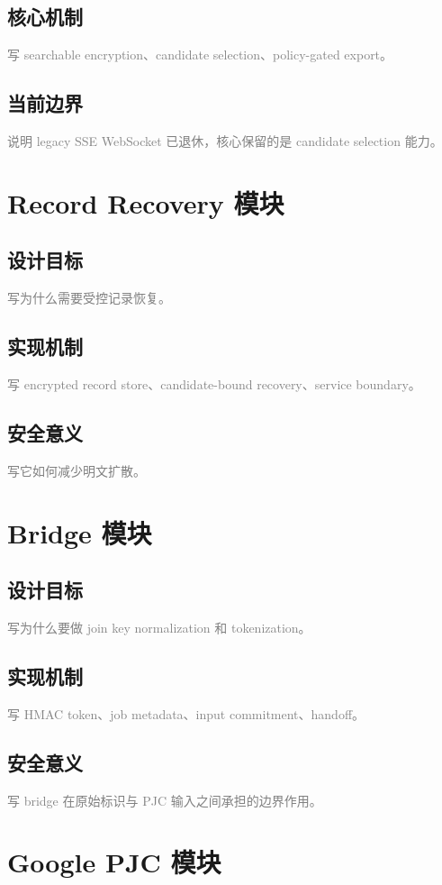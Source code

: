 \documentclass[UTF8,a4paper,12pt,oneside]{ctexrep}
\newcommand{\placeholder}[1]{\textcolor{gray}{#1}}
\begin{document}
\subsection{核心机制}
\placeholder{写 searchable encryption、candidate selection、policy-gated export。}
\subsection{当前边界}
\placeholder{说明 legacy SSE WebSocket 已退休，核心保留的是 candidate selection 能力。}

\section{Record Recovery 模块}
\subsection{设计目标}
\placeholder{写为什么需要受控记录恢复。}
\subsection{实现机制}
\placeholder{写 encrypted record store、candidate-bound recovery、service boundary。}
\subsection{安全意义}
\placeholder{写它如何减少明文扩散。}

\section{Bridge 模块}
\subsection{设计目标}
\placeholder{写为什么要做 join key normalization 和 tokenization。}
\subsection{实现机制}
\placeholder{写 HMAC token、job metadata、input commitment、handoff。}
\subsection{安全意义}
\placeholder{写 bridge 在原始标识与 PJC 输入之间承担的边界作用。}

\section{Google PJC 模块}
\end{document}
